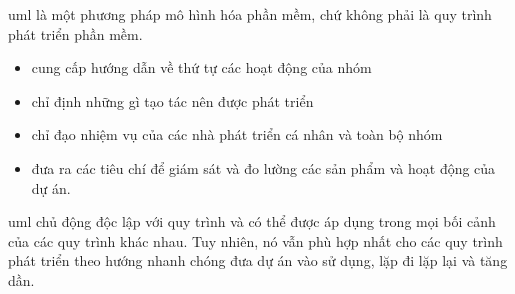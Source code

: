 {{\acrshort{uml} là một phương pháp mô hình hóa phần mềm, chứ không phải là quy trình phát triển phần mềm.
\begin{itemize}
\item cung cấp hướng dẫn về thứ tự các hoạt động của nhóm
\item chỉ định những gì tạo tác nên được phát triển
\item chỉ đạo nhiệm vụ của các nhà phát triển cá nhân và toàn bộ nhóm
\item đưa ra các tiêu chí để giám sát và đo lường các sản phẩm và hoạt động của dự án.
\end{itemize}
\acrshort{uml} chủ động độc lập với quy trình và có thể được áp dụng trong mọi bối cảnh của các quy trình khác nhau. Tuy nhiên, nó vẫn phù hợp nhất cho các quy trình phát triển theo hướng nhanh chóng đưa dự án vào sử dụng, lặp đi lặp lại và tăng dần.

}}
